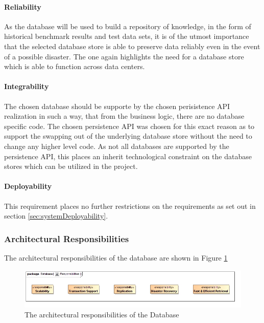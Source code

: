 \paragraph{Reliability}
As the database will be used to build a repository of knowledge, in the form of
historical benchmark results and test data sets, it is of the utmost importance
that the selected database store is able to preserve data reliably even in the
event of a possible disaster. The one again highlights the need for a database
store which is able to function across data centers.

\paragraph{Integrability}
The chosen database should be supporte by the chosen perisistence API realization
in such a way, that from the business logic, there are no database specific
code. The chosen persistence API was chosen for this exact reason as to support
the swapping out of the underlying database store without the need to change any
higher level code. As not all databases are supported by the persistence API,
this places an inherit technological constraint on the database stores which can
be utilized in the project.

\paragraph{Deployability}
This requirement places no further restrictions on the requirements as set out
in section \ref{sec:systemDeployability}.

\subsubsection{Architectural Responsibilities}
The architectural responsibilities of the database are shown in 
Figure \ref{fig:databaseResponsibilities}
\begin{figure}[H]
	\begin{center}
	\includegraphics[scale=0.5]{../Diagrams and Charts/Database/Responsibilities.jpg}
	\caption{The architectural responsibilities of the Database}
	\label{fig:databaseResponsibilities}
	\end{center}
\end{figure}

